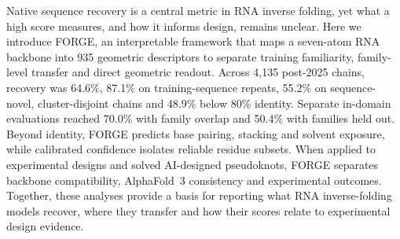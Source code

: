 Native sequence recovery is a central metric in RNA inverse folding, yet what a high score measures, and how it informs design, remains unclear. Here we introduce FORGE, an interpretable framework that maps a seven-atom RNA backbone into 935 geometric descriptors to separate training familiarity, family-level transfer and direct geometric readout. Across 4,135 post-2025 chains, recovery was 64.6\%, 87.1\% on
training-sequence repeats, 55.2\% on sequence-novel, cluster-disjoint chains and
48.9\% below 80\% identity. Separate in-domain evaluations reached
70.0\% with family overlap and 50.4\% with families held out. Beyond identity, FORGE predicts base pairing, stacking and solvent
exposure, while calibrated confidence isolates reliable residue subsets. When applied to experimental designs and solved AI-designed pseudoknots, FORGE separates backbone compatibility, AlphaFold~3 consistency and experimental outcomes. Together, these analyses provide a basis for reporting what RNA inverse-folding models recover, where they transfer and how their scores relate to experimental design evidence.
